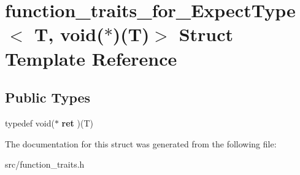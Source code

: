 \hypertarget{structfunction__traits__for___expect_type_3_01_t_00_01void_07_5_08_07_t_08_4}{\section{function\-\_\-traits\-\_\-for\-\_\-\-Expect\-Type$<$ T, void($\ast$)(T)$>$ Struct Template Reference}
\label{structfunction__traits__for___expect_type_3_01_t_00_01void_07_5_08_07_t_08_4}
}
\subsection*{Public Types}
\begin{DoxyCompactItemize}
\item 
\hypertarget{structfunction__traits__for___expect_type_3_01_t_00_01void_07_5_08_07_t_08_4_a7786784708eb868865d45beb725d9965}{typedef void($\ast$ {\bfseries ret} )(T)}\label{structfunction__traits__for___expect_type_3_01_t_00_01void_07_5_08_07_t_08_4_a7786784708eb868865d45beb725d9965}

\end{DoxyCompactItemize}


The documentation for this struct was generated from the following file\-:\begin{DoxyCompactItemize}
\item 
src/function\-\_\-traits.\-h\end{DoxyCompactItemize}
